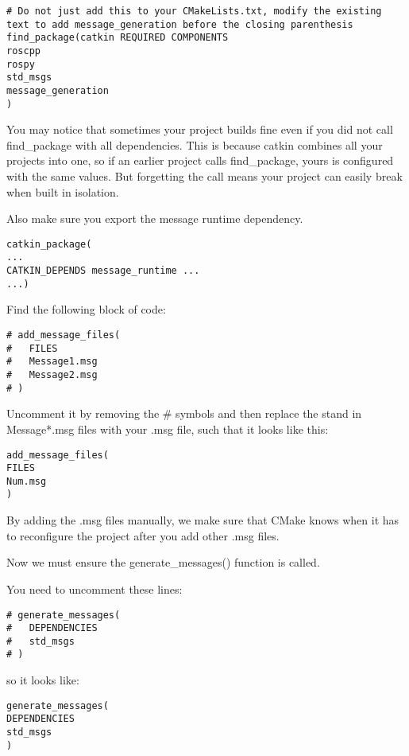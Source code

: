 \begin{lstlisting}[breaklines=true languages=bash]
# Do not just add this to your CMakeLists.txt, modify the existing text to add message_generation before the closing parenthesis
find_package(catkin REQUIRED COMPONENTS
roscpp
rospy
std_msgs
message_generation
)
\end{lstlisting}

You may notice that sometimes your project builds fine even if you did not call find\_package with all dependencies. This is because catkin combines all your projects into one, so if an earlier project calls find\_package, yours is configured with the same values. But forgetting the call means your project can easily break when built in isolation.

Also make sure you export the message runtime dependency.

\begin{lstlisting}[breaklines=true languages=bash]
catkin_package(
...
CATKIN_DEPENDS message_runtime ...
...)
\end{lstlisting}

Find the following block of code:

\begin{lstlisting}[breaklines=true languages=bash]
# add_message_files(
#   FILES
#   Message1.msg
#   Message2.msg
# )
\end{lstlisting}

Uncomment it by removing the \# symbols and then replace the stand in Message*.msg files with your .msg file, such that it looks like this:

\begin{lstlisting}[breaklines=true languages=bash]
add_message_files(
FILES
Num.msg
)
\end{lstlisting}

By adding the .msg files manually, we make sure that CMake knows when it has to reconfigure the project after you add other .msg files.

Now we must ensure the generate\_messages() function is called.

You need to uncomment these lines:

\begin{lstlisting}[breaklines=true languages=bash]
# generate_messages(
#   DEPENDENCIES
#   std_msgs
# )
\end{lstlisting}

so it looks like:

\begin{lstlisting}[breaklines=true languages=bash]
generate_messages(
DEPENDENCIES
std_msgs
)
\end{lstlisting}

